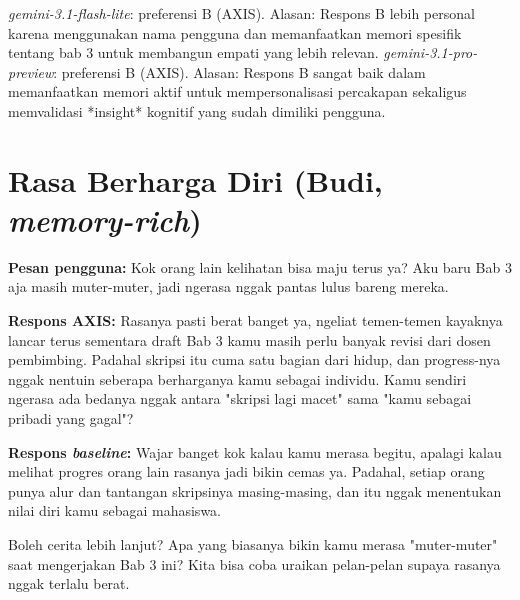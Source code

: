 \textit{gemini-3.1-flash-lite}: preferensi B (AXIS). Alasan: Respons B lebih personal karena menggunakan nama pengguna dan memanfaatkan memori spesifik tentang bab 3 untuk membangun empati yang lebih relevan.\newline
\textit{gemini-3.1-pro-preview}: preferensi B (AXIS). Alasan: Respons B sangat baik dalam memanfaatkan memori aktif untuk mempersonalisasi percakapan sekaligus memvalidasi *insight* kognitif yang sudah dimiliki pengguna.\newline

\section{Rasa Berharga Diri (Budi, \textit{memory-rich})}

\textbf{Pesan pengguna:} Kok orang lain kelihatan bisa maju terus ya? Aku baru Bab 3 aja masih muter-muter, jadi ngerasa nggak pantas lulus bareng mereka.

\textbf{Respons AXIS:} Rasanya pasti berat banget ya, ngeliat temen-temen kayaknya lancar terus sementara draft Bab 3 kamu masih perlu banyak revisi dari dosen pembimbing. Padahal skripsi itu cuma satu bagian dari hidup, dan progress-nya nggak nentuin seberapa berharganya kamu sebagai individu. Kamu sendiri ngerasa ada bedanya nggak antara "skripsi lagi macet" sama "kamu sebagai pribadi yang gagal"?

\textbf{Respons \textit{baseline}:} Wajar banget kok kalau kamu merasa begitu, apalagi kalau melihat progres orang lain rasanya jadi bikin cemas ya. Padahal, setiap orang punya alur dan tantangan skripsinya masing-masing, dan itu nggak menentukan nilai diri kamu sebagai mahasiswa.

Boleh cerita lebih lanjut? Apa yang biasanya bikin kamu merasa "muter-muter" saat mengerjakan Bab 3 ini? Kita bisa coba uraikan pelan-pelan supaya rasanya nggak terlalu berat.

